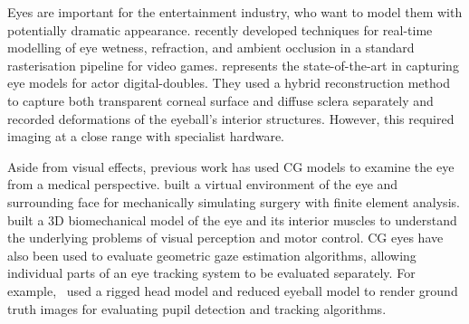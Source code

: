 
Eyes are important for the entertainment industry, who want to model them with potentially dramatic appearance.
\mbox{\citet{ActiBlizEyes}} recently developed techniques for real-time modelling of eye wetness, refraction, and ambient occlusion in a standard rasterisation pipeline for video games.
\citet{berard2014highquality} represents the state-of-the-art in capturing eye models for actor digital-doubles.
They used a hybrid reconstruction method to capture both transparent corneal surface and diffuse sclera separately and recorded deformations of the eyeball's interior structures.
However, this required imaging at a close range with specialist hardware.

Aside from visual effects, previous work has used CG models to examine the eye from a medical perspective.
\citet{sagar1994virtual} built a virtual environment of the eye and surrounding face for mechanically simulating surgery with finite element analysis.
\citet{priamikov14_openeyesim} built a 3D biomechanical model of the eye and its interior muscles to understand the underlying problems of visual perception and motor control.
CG eyes have also been used to evaluate geometric gaze estimation algorithms, allowing individual parts of an eye tracking system to be evaluated separately.
For example,~\citet{swirski2014rendering} used a rigged head model and reduced eyeball model to render ground truth images for evaluating pupil detection and tracking algorithms.





